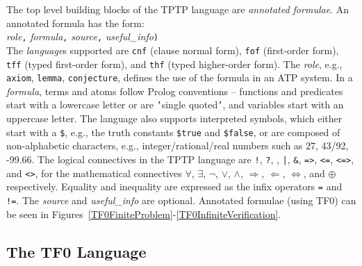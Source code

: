 \documentclass{easychair}
\newcommand{\smalltt}[1]{\small \texttt{#1}}
\begin{document}
The top level building blocks of the TPTP language are {\em annotated formulae}.
An annotated formula has the form:\\
{\em role}{\tt ,}
{\em formula}{\tt ,}
{\em source}{\tt ,}
{\em useful\_info}{\tt )}\\
The {\em language}s supported are {\smalltt{cnf}} (clause normal form), {\smalltt{fof}}
(first-order form), {\smalltt{tff}} (typed first-order form), and {\smalltt{thf}}
(typed higher-order form).
The {\em role}, e.g., {\smalltt{axiom}}, {\smalltt{lemma}}, {\smalltt{conjecture}},
defines the use of the formula in an ATP system.
In a {\em formula}, terms and atoms follow Prolog conventions
-- functions and predicates start with a lowercase letter or are {\tt '}single quoted{\tt '}, and 
variables start with an uppercase letter.
The language also supports interpreted symbols, which either start with a {\tt \$}, e.g., 
the truth constants {\smalltt{\$true}} and {\smalltt{\$false}}, or are composed of 
non-alphabetic characters, e.g., integer/rational/real numbers such as 27, 43/92, -99.66.
The logical connectives in the TPTP language are
{\tt !}, {\tt ?}, {\tt {\raisebox{0.4ex}{\texttildelow}}}, {\tt |}, {\tt \&}, {\tt =>}, {\tt <=},
{\tt <=>}, and {\tt <{\raisebox{0.4ex}{\texttildelow}}>},
for the mathematical connectives
$\forall$, $\exists$, $\neg$, $\vee$, $\wedge$, $\Rightarrow$, $\Leftarrow$, $\Leftrightarrow$, 
and $\oplus$ respectively.
Equality and inequality are expressed as the infix operators {\tt =} and {\tt !=}.
The {\em source} and {\em useful\_info} are optional.
Annotated formulae (using TF0) can be seen in 
Figures~\ref{TF0FiniteProblem}-\ref{TF0InfiniteVerification}.

\subsection{The TF0 Language}
\label{TF0}
\end{document}
